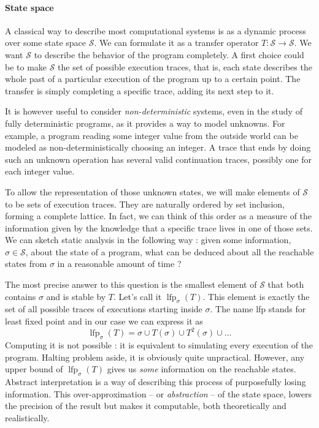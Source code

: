 \documentclass[11pt]{article}
\renewcommand{\S}{\mathcal{S}}
\DeclareMathOperator{\lfp}{lfp}
\begin{document}
\paragraph{State space} A classical way to describe most computational systems is as a dynamic process over some state space $\S$. We can formulate it as a transfer operator $T:\S\to\S$. We want $\S$ to describe the behavior of the program completely. A first choice could be to make $\S$ the set of possible execution traces, that is, each state describes the whole past of a particular execution of the program up to a certain point. The transfer is simply completing a specific trace, adding its next step to it.

It is however useful to consider \emph{non-deterministic} systems, even in the study of fully deterministic programs, as it provides a way to model unknowns. For example, a program reading some integer value from the outside world can be modeled as non-deterministically choosing an integer. A trace that ends by doing such an unknown operation has several valid continuation traces, possibly one for each integer value.

To allow the representation of those unknown states, we will make elements of $\S$ to be sets of execution traces. They are naturally ordered by set inclusion, forming a complete lattice.
In fact, we can think of this order as a measure of the information given by the knowledge that a specific trace lives in one of those sets.
We can sketch static analysis in the following way : given some information, $\sigma\in\S$, about the state of a program, what can be deduced about
all the reachable states from $\sigma$ in a reasonable amount of time ?

The most precise answer to this question is the smallest element of $\S$ that both contains $\sigma$ and is stable by $T$. Let's call it $\lfp_\sigma(T)$. This element is exactly the set of all possible traces of executions starting inside $\sigma$. The name lfp stands for least fixed point and in our case we can express it as
\[ \lfp_\sigma(T) = \sigma \cup T(\sigma) \cup T^2(\sigma) \cup \dots \]
Computing it is not possible : it is equivalent to simulating every execution of the program. Halting problem aside, it is obviously quite unpractical. However, any upper bound of $\lfp_\sigma(T)$ gives us \emph{some} information on the reachable states. Abstract interpretation is a way of describing this process of purposefully losing information. This over-approximation -- or \emph{abstraction} -- of the state space, lowers the precision of the result but makes it computable, both theoretically and realistically.
\end{document}
